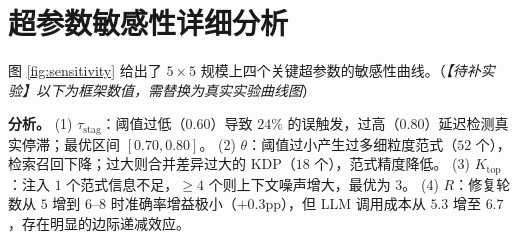 \documentclass[UTF8,a4paper,12pt]{ctexart}
\begin{document}
\section{超参数敏感性详细分析}

图 \ref{fig:sensitivity} 给出了 \(5\times5\) 规模上四个关键超参数的敏感性曲线。（\textit{【待补实验】以下为框架数值，需替换为真实实验曲线图}）

\begin{table}[h]
  \centering
  \caption{超参数敏感性（\(5\times5\) 规模准确率 \%）。粗体为默认值。}
  \label{fig:sensitivity}
\end{table}

\textbf{分析。}
(1) \(\tau_{\text{stag}}\)：阈值过低（\(0.60\)）导致 \(24\%\) 的误触发，过高（\(0.80\)）延迟检测真实停滞；最优区间 \([0.70, 0.80]\)。
(2) \(\theta\)：阈值过小产生过多细粒度范式（\(52\) 个），检索召回下降；过大则合并差异过大的 KDP（\(18\) 个），范式精度降低。
(3) \(K_{\text{top}}\)：注入 \(1\) 个范式信息不足，\(\geq 4\) 个则上下文噪声增大，最优为 \(3\)。
(4) \(R\)：修复轮数从 \(5\) 增到 \(6\)--\(8\) 时准确率增益极小（\(+0.3\)pp），但 LLM 调用成本从 \(5.3\) 增至 \(6.7\)，存在明显的边际递减效应。
\end{document}
